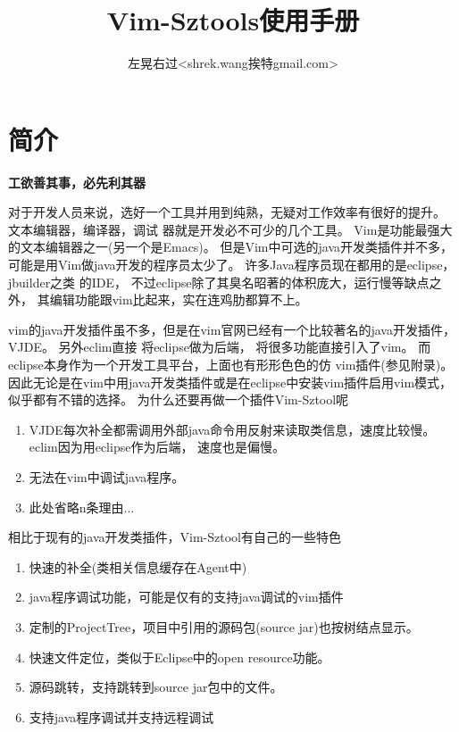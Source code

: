 \documentclass[oneside,openany]{book}
\title{Vim-Sztools使用手册}
\author{左晃右过<shrek.wang挨特gmail.com>}
\begin{document}
\maketitle

\chapter{简介}

  \begin{center}
    \large\textbf{工欲善其事，必先利其器}
  \end{center}

  对于开发人员来说，选好一个工具并用到纯熟，无疑对工作效率有很好的提升。 文本编辑器，编译器，调试
器就是开发必不可少的几个工具。  Vim是功能最强大的文本编辑器之一(另一个是Emacs)。 
但是Vim中可选的java开发类插件并不多， 可能是用Vim做java开发的程序员太少了。 许多Java程序员现在都用的是eclipse，jbuilder之类
的IDE， 不过eclipse除了其臭名昭著的体积庞大，运行慢等缺点之外， 其编辑功能跟vim比起来，实在连鸡肋都算不上。 

  vim的java开发插件虽不多，但是在vim官网已经有一个比较著名的java开发插件，VJDE。 另外eclim直接
将eclipse做为后端， 将很多功能直接引入了vim。 而eclipse本身作为一个开发工具平台，上面也有形形色色的仿
vim插件(参见附录)。因此无论是在vim中用java开发类插件或是在eclipse中安装vim插件启用vim模式， 似乎都有不错的选择。
为什么还要再做一个插件Vim-Sztool呢
  
  \begin{enumerate}
    \item VJDE每次补全都需调用外部java命令用反射来读取类信息，速度比较慢。eclim因为用eclipse作为后端， 速度也是偏慢。
    \item 无法在vim中调试java程序。
    \item 此处省略n条理由...
  \end{enumerate}

  相比于现有的java开发类插件，Vim-Sztool有自己的一些特色
  \begin{enumerate}
    \item 快速的补全(类相关信息缓存在Agent中)
    \item java程序调试功能，可能是仅有的支持java调试的vim插件
    \item 定制的ProjectTree，项目中引用的源码包(source jar)也按树结点显示。
    \item 快速文件定位，类似于Eclipse中的open resource功能。
    \item 源码跳转，支持跳转到source jar包中的文件。
    \item 支持java程序调试并支持远程调试
  \end{enumerate}
\end{document}

